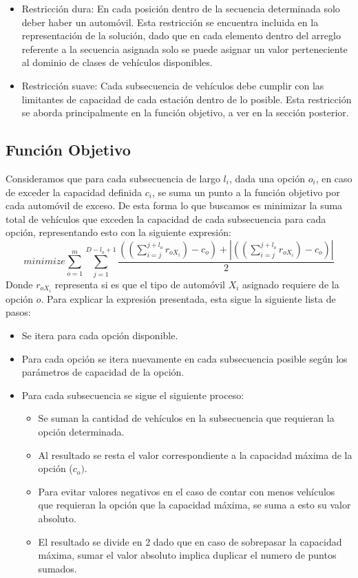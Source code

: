 \documentclass[letter, 10pt]{article}
\begin{document}
\begin{itemize}
    \item Restricción dura: En cada posición dentro de la secuencia determinada solo deber haber un automóvil. Esta restricción se encuentra incluida en la representación de la solución, dado que en cada elemento dentro del arreglo referente a la secuencia asignada solo se puede asignar un valor perteneciente al dominio de clases de vehículos disponibles.
    \item Restricción suave: Cada subsecuencia de vehículos debe cumplir con las limitantes de capacidad de cada estación dentro de lo posible. Esta restricción se aborda principalmente en la función objetivo, a ver en la sección posterior.
\end{itemize}

\subsection{Función Objetivo}
Consideramos que para cada subsecuencia de largo $l_i$, dada una opción $o_i$, en caso de exceder la capacidad definida $c_i$, se suma un punto a la función objetivo por cada automóvil de exceso. De esta forma lo que buscamos es minimizar la suma total de vehículos que exceden la capacidad de cada subsecuencia para cada opción, representando esto con la siguiente expresión:
\begin{equation*}
    minimize \sum^{m}_{o=1}\sum^{D-l_o+1}_{j=1} \frac{((\sum^{j+l_o}_{i=j} r_{oX_i}) - c_o) + |((\sum^{j+l_o}_{i=j} r_{oX_i}) - c_o)|}{2}
\end{equation*}
Donde $r_{oX_i}$ representa si es que el tipo de automóvil $X_i$ asignado requiere de la opción $o$. Para explicar la expresión presentada, esta sigue la siguiente lista de pasos:
\begin{itemize}
    \item Se itera para cada opción disponible.
    \item Para cada opción se itera nuevamente en cada subsecuencia posible según los parámetros de capacidad de la opción.
    \item Para cada subsecuencia se sigue el siguiente proceso:
    \begin{itemize}
        \item Se suman la cantidad de vehículos en la subsecuencia que requieran la opción determinada.
        \item Al resultado se resta el valor correspondiente a la capacidad máxima de la opción ($c_o)$.
        \item Para evitar valores negativos en el caso de contar con menos vehículos que requieran la opción que la capacidad máxima, se suma a esto su valor absoluto.
        \item El resultado se divide en 2 dado que en caso de sobrepasar la capacidad máxima, sumar el valor absoluto implica duplicar el numero de puntos sumados.
    \end{itemize}
\end{itemize}
\end{document}
